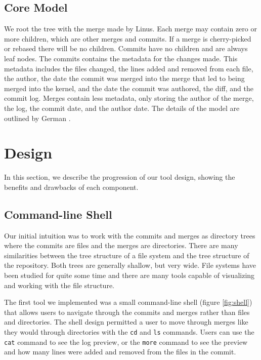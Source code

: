 \documentclass[conference, draftclsnofoot]{IEEEtran}
\begin{document}
\subsection{Core Model}

We root the tree with the merge made by Linus. Each merge may contain zero or more
children, which are other merges and commits. If a merge is cherry-picked or rebased
there will be no children. Commits have no children and are always leaf nodes. The
commits contains the metadata for the changes made. This metadata includes the files
changed, the lines added and removed from each file, the author, the date the commit
was merged into the merge that led to being merged into the kernel, and the date the
commit was authored, the diff, and the commit log. Merges contain less metadata,
only storing the author of the merge, the log, the commit date, and the author date.
The details of the model are outlined by German \cite{German2015}.

\section{Design}

In this section, we describe the progression of our tool design, showing the
benefits and drawbacks of each component.

\subsection{Command-line Shell}

Our initial intuition was to work with the commits and merges as directory trees
where the commits are files and the merges are directories. There are many
similarities between the tree structure of a file system and the tree structure of
the repository. Both trees are generally shallow, but very wide. File systems have
been studied for quite some time and there are many tools capable of visualizing and
working with the file structure.

The first tool we implemented was a small command-line shell (figure
\ref{fig:shell}) that allows users to navigate through the commits and merges rather
than files and directories. The shell design permitted a user to move through merges
like they would through directories with the \verb|cd| and \verb|ls| commands. Users
can use the \verb|cat| command to see the log preview, or the \verb|more| command to
see the preview and how many lines were added and removed from the files in the
commit.
\end{document}
